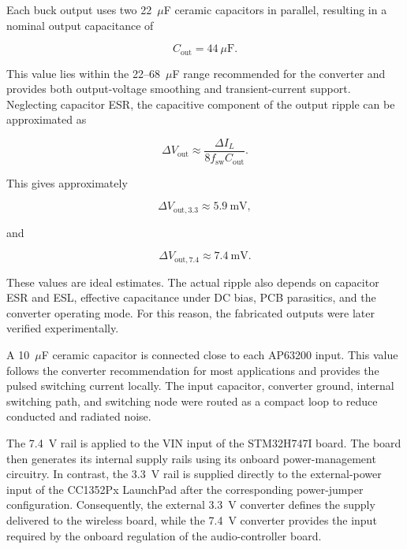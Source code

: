 Each buck output uses two 22~$\mu$F ceramic capacitors in parallel, resulting in a nominal output capacitance of

\begin{equation}
C_{\mathrm{out}} = 44~\mu\mathrm{F}.
\end{equation}

This value lies within the 22--68~$\mu$F range recommended for the converter and provides both output-voltage smoothing and transient-current support. Neglecting capacitor ESR, the capacitive component of the output ripple can be approximated as

\begin{equation}
\Delta V_{\mathrm{out}}
\approx
\frac{\Delta I_L}
{8f_{\mathrm{sw}}C_{\mathrm{out}}}.
\end{equation}

This gives approximately

\begin{equation}
\Delta V_{\mathrm{out},3.3}
\approx 5.9~\mathrm{mV},
\end{equation}

and

\begin{equation}
\Delta V_{\mathrm{out},7.4}
\approx 7.4~\mathrm{mV}.
\end{equation}

These values are ideal estimates. The actual ripple also depends on capacitor ESR and ESL, effective capacitance under DC bias, PCB parasitics, and the converter operating mode. For this reason, the fabricated outputs were later verified experimentally.

A 10~$\mu$F ceramic capacitor is connected close to each AP63200 input. This value follows the converter recommendation for most applications and provides the pulsed switching current locally. The input capacitor, converter ground, internal switching path, and switching node were routed as a compact loop to reduce conducted and radiated noise.

The 7.4~V rail is applied to the VIN input of the STM32H747I board. The board then generates its internal supply rails using its onboard power-management circuitry. In contrast, the 3.3~V rail is supplied directly to the external-power input of the CC1352Px LaunchPad after the corresponding power-jumper configuration. Consequently, the external 3.3~V converter defines the supply delivered to the wireless board, while the 7.4~V converter provides the input required by the onboard regulation of the audio-controller board.

